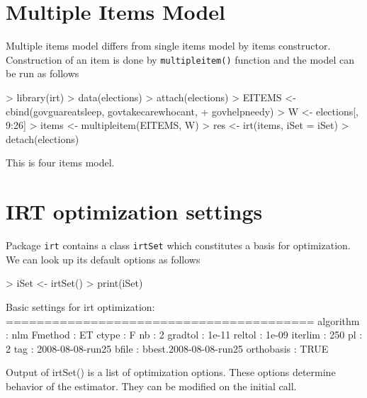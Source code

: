 \documentclass{amsart}
\newcommand{\Rpackage}[1]{{\texttt{#1}}}
\begin{document}
\section{Multiple Items Model}
Multiple items model differs from single items model by items constructor. Construction of an item is done by {\tt multipleitem()} function and the model can be run as follows

\begin{Schunk}
\begin{Sinput}
> library(irt)
> data(elections)
> attach(elections)
> EITEMS <- cbind(govguareatsleep, govtakecarewhocant, 
+     govhelpneedy)
> W <- elections[, 9:26]
> items <- multipleitem(EITEMS, W)
> res <- irt(items, iSet = iSet)
> detach(elections)
\end{Sinput}
\end{Schunk}
This is four items model.
\section{IRT optimization settings}
Package \Rpackage{irt} contains a class {\tt irtSet} which constitutes a basis
for optimization. We can look up its default options as follows
\begin{Schunk}
\begin{Sinput}
> iSet <- irtSet()
> print(iSet)
\end{Sinput}
\begin{Soutput}
 Basic settings for irt optimization:
 ======================================== 
        algorithm : nlm
          Fmethod : ET
            ctype : F
               nb : 2
          gradtol : 1e-11
           reltol : 1e-09
          iterlim : 250
               pl : 2
              tag : 2008-08-08-run25
            bfile : bbest.2008-08-08-run25
       orthobasis : TRUE
\end{Soutput}
\end{Schunk}
Output of irtSet() is a list of optimization options. These options determine behavior of the estimator.
They can be modified on the initial call.
\end{document}
